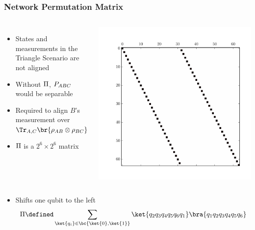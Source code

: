 \documentclass[
    hyperref={colorlinks=true, linkcolor=blue, urlcolor=blue, citecolor=MidnightBlue},
    xcolor={dvipsnames},
]{beamer}
\begin{document}
\begin{frame}
    \frametitle{Network Permutation Matrix}
    \begin{columns}
        \begin{itemize}
            \item States and measurements in the Triangle Scenario are not aligned
            \item Without $\Pi$, $\prob[ABC]$ would be separable
            \item Required to align $B$'s measurement over $\Tr_{A,C}\br{\rho_{AB} \otimes \rho_{BC}}$
            \item $\Pi$ is a $2^6 \times 2^6$ matrix
        \end{itemize}
            \includegraphics[trim={1.0cm 1.2cm 1.0cm 1cm},clip,width=1.0\textwidth]{../../figures/perm_mtrx.pdf}
    \end{columns}
    \begin{itemize}
        \item Shifts one qubit to the left
        \[ \netperm \defined \sum_{\ket{q_i} \in \bc{\ket{0}, \ket{1}}}\ket{q_2q_3q_4q_5q_6q_1}\bra{q_1q_2q_3q_4q_5q_6} \]
    \end{itemize}

\end{frame}
\end{document}
